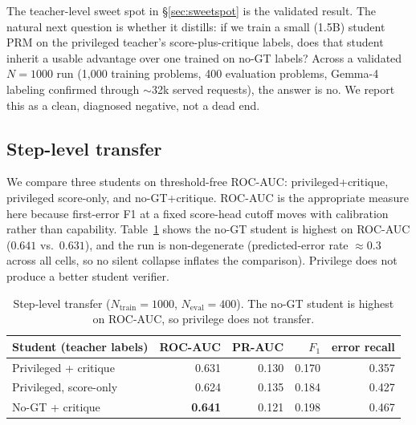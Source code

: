 \documentclass{article}
\begin{document}
The teacher-level sweet spot in \S\ref{sec:sweetspot} is the validated
result. The natural next question is whether it distills: if we train a
small (1.5B) student PRM on the privileged teacher's score-plus-critique
labels, does that student inherit a usable advantage over one trained on
no-GT labels? Across a validated $N=1000$ run (1{,}000 training problems,
400 evaluation problems, Gemma-4 labeling confirmed through $\sim$32k served
requests), the answer is no. We report this as a clean, diagnosed negative,
not a dead end.

\subsection{Step-level transfer}
We compare three students on threshold-free ROC-AUC: privileged+critique,
privileged score-only, and no-GT+critique. ROC-AUC is the appropriate measure here
because first-error F1 at a fixed score-head cutoff moves with calibration
rather than capability. Table~\ref{tab:step-transfer} shows the no-GT
student is highest on ROC-AUC ($0.641$ vs.\ $0.631$), and the run is
non-degenerate (predicted-error rate $\approx 0.3$ across all cells, so no
silent collapse inflates the comparison). Privilege does not produce a
better student verifier.

\begin{table}[t]
\centering
\small
\begin{tabular}{lrrrr}
\toprule
Student (teacher labels) & ROC-AUC & PR-AUC & $F_1$ & error recall \\
\midrule
Privileged + critique & 0.631 & 0.130 & 0.170 & 0.357 \\
Privileged, score-only & 0.624 & 0.135 & 0.184 & 0.427 \\
No-GT + critique & \textbf{0.641} & 0.121 & 0.198 & 0.467 \\
\bottomrule
\end{tabular}
\caption{Step-level transfer ($N_\text{train}=1000$, $N_\text{eval}=400$).
The no-GT student is highest on ROC-AUC, so privilege does not transfer.}
\label{tab:step-transfer}
\end{table}
\end{document}

